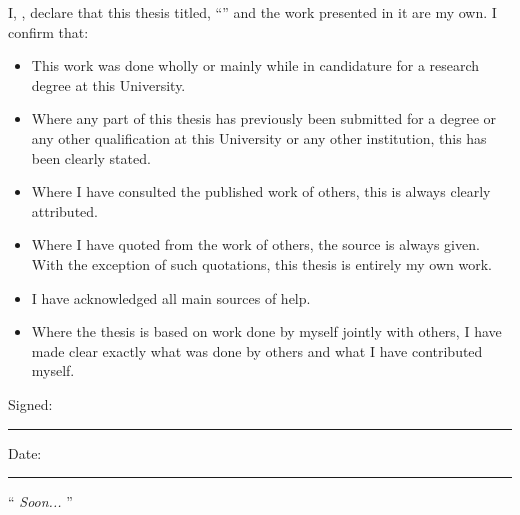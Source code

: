 \documentclass[
11pt, %
english, %
onehalfspacing, %
headsepline, %
]{MastersDoctoralThesis} %
\begin{document}

\begin{declaration}
\addchaptertocentry{\authorshipname} %
\noindent I, \authorname, declare that this thesis titled, \enquote{\ttitle} and the work presented in it are my own. I confirm that:

\begin{itemize} 
\item This work was done wholly or mainly while in candidature for a research degree at this University.
\item Where any part of this thesis has previously been submitted for a degree or any other qualification at this University or any other institution, this has been clearly stated.
\item Where I have consulted the published work of others, this is always clearly attributed.
\item Where I have quoted from the work of others, the source is always given. With the exception of such quotations, this thesis is entirely my own work.
\item I have acknowledged all main sources of help.
\item Where the thesis is based on work done by myself jointly with others, I have made clear exactly what was done by others and what I have contributed myself.\\
\end{itemize}
 
\noindent Signed:\\
\rule[0.5em]{25em}{0.5pt} %
 
\noindent Date:\\
\rule[0.5em]{25em}{0.5pt} %
\end{declaration}

\cleardoublepage


\vspace*{0.2\textheight}

\noindent\enquote{\itshape 
Soon... %
}
\bigbreak
\end{document}
